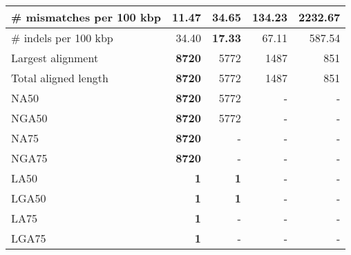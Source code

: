 \documentclass[12pt,a4paper]{article}
\begin{document}
\begin{table}[ht]
\begin{center}
\begin{tabular}{|l*{4}{|r}|}
\# mismatches per 100 kbp & {\bf 11.47} & 34.65 & 134.23 & 2232.67 \\ \hline
\# indels per 100 kbp & 34.40 & {\bf 17.33} & 67.11 & 587.54 \\ \hline
Largest alignment & {\bf 8720} & 5772 & 1487 & 851 \\ \hline
Total aligned length & {\bf 8720} & 5772 & 1487 & 851 \\ \hline
NA50 & {\bf 8720} & 5772 & - & - \\ \hline
NGA50 & {\bf 8720} & 5772 & - & - \\ \hline
NA75 & {\bf 8720} & - & - & - \\ \hline
NGA75 & {\bf 8720} & - & - & - \\ \hline
LA50 & {\bf 1} & {\bf 1} & - & - \\ \hline
LGA50 & {\bf 1} & {\bf 1} & - & - \\ \hline
LA75 & {\bf 1} & - & - & - \\ \hline
LGA75 & {\bf 1} & - & - & - \\ \hline
\end{tabular}
\end{center}
\end{table}
\end{document}
